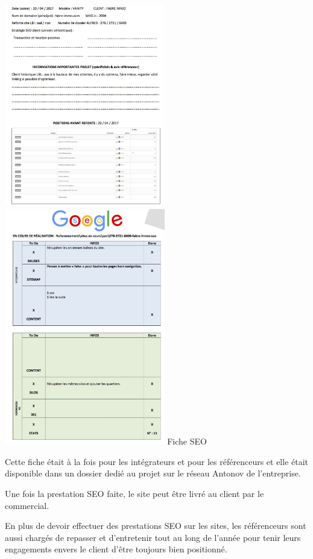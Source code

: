 \documentclass[12pt]{article}
\begin{document}
\begin{center}

\includegraphics[width=7cm]{seo1.png}
\includegraphics[width=7cm]{seo2.png}\hfill
Fiche SEO
\end{center}
\vspace{0.5cm}
Cette fiche était à la fois pour les intégrateurs et pour les référenceurs et elle était disponible dans un dossier dedié au projet sur le réseau Antonov de l'entreprise.

Une fois la prestation SEO faite, le site peut être livré au client par le commercial.

En plus de devoir effectuer des prestations SEO sur les sites, les référenceurs sont aussi chargés de repasser et d'entretenir tout au long de l'année pour tenir leurs engagements envers le client d'être toujours bien positionné.
\end{document}
